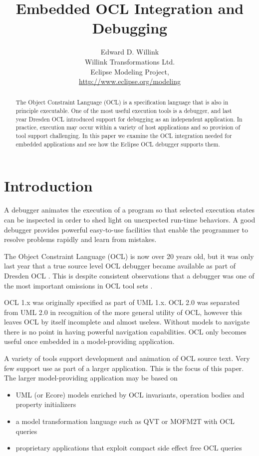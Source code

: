 \documentclass[a4paper]{article}
\title{Embedded OCL Integration and Debugging}
\author{
Edward D. Willink \\ Willink Transformations Ltd.\\
                Eclipse Modeling Project, \\ \url{http://www.eclipse.org/modeling}
}
\begin{document}
\maketitle

\begin{abstract}
The Object Constraint Language (OCL) is a specification language that is also in principle executable. One of the most useful execution tools is a debugger, and last year Dresden OCL introduced support for debugging as an independent application.  In practice, execution may occur within a variety of host applications and so provision of tool support challenging. In this paper we examine the OCL integration needed for embedded applications and see how the Eclipse OCL debugger supports them.  
\end{abstract}
\vskip 32pt

\section{Introduction}
A debugger animates the execution of a program so that selected execution states can be inspected in order to shed light on unexpected run-time behaviors. A good debugger provides powerful easy-to-use facilities that enable the programmer to resolve problems rapidly and learn from mistakes.

The Object Constraint Language (OCL)  \cite{OCL-2.4} is now over 20 years old, but it was only last year that a true source level OCL debugger became available as part of Dresden OCL \cite{DresdenOCL-Debug}. This is despite consistent observations that a debugger was one of the most important omissions in OCL tool sets \cite{Chimiak-Opaka}.

OCL 1.x was originally specified as part of UML 1.x. OCL 2.0 was separated from UML 2.0 in recognition of the more general utility of OCL, however this leaves OCL by itself incomplete and almost useless. Without models to navigate there is no point in having powerful navigation capabilities. OCL only becomes useful once embedded in a model-providing application.

A variety of tools support development and animation of OCL source text. Very few support use as part of a larger application. This is the focus of this paper. The larger model-providing application may be based on 

\begin{itemize}
\item UML \cite{UML-2.5} (or Ecore\cite{EMF}) models enriched by OCL invariants, operation bodies and property initializers
\item a model transformation language such as QVT \cite{QVT-1.2} or MOFM2T\cite{MOFM2T} with OCL queries
\item proprietary applications that exploit compact side effect free OCL queries
\end{itemize}
\end{document}
